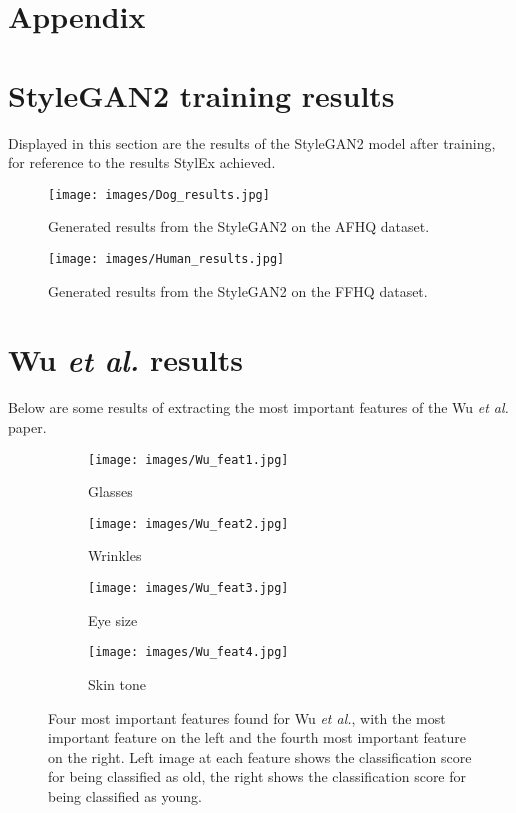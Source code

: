 \newpage
\appendix

\section*{Appendix}
\label{sec:appendix}

\section{StyleGAN2 training results}
Displayed in this section are the results of the StyleGAN2 model after training, for reference to the results StylEx achieved.
\begin{figure}[H]
     \centering
     \texttt{[image: images/Dog\_results.jpg]}
     \caption{Generated results from the StyleGAN2 on the AFHQ dataset.}
     \label{fig:SG2_Anim}
\end{figure}


\begin{figure}[H]
     \centering
     \texttt{[image: images/Human\_results.jpg]}
     \caption{Generated results from the StyleGAN2 on the FFHQ dataset.}
     \label{fig:SG2_Hum}
\end{figure}

\section{Wu \textit{et al.} results}
Below are some results of extracting the most important features of the Wu \textit{et al.} paper.
\begin{figure}[H]
     \centering
     \begin{subfigure}[b]{0.24\textwidth}
     \centering
     \texttt{[image: images/Wu\_feat1.jpg]}
     \caption{Glasses}
     \label{fig:wu1}
     \end{subfigure}
     \hfill
     \begin{subfigure}[b]{0.24\textwidth}
     \centering
     \texttt{[image: images/Wu\_feat2.jpg]}
     \caption{Wrinkles}
     \label{fig:wu2}
     \end{subfigure}
     \hfill
     \begin{subfigure}[b]{0.24\textwidth}
     \centering
     \texttt{[image: images/Wu\_feat3.jpg]}
     \caption{Eye size}
     \label{fig:wu3}
     \end{subfigure}
     \hfill
     \begin{subfigure}[b]{0.24\textwidth}
     \centering
     \texttt{[image: images/Wu\_feat4.jpg]}
     \caption{Skin tone}
     \label{fig:wu4}
     \end{subfigure}
     \caption{Four most important features found for Wu \textit{et al.}, with the most important feature on the left and the fourth most important feature on the right. Left image at each feature shows the classification score for being classified as old, the right shows the classification score for being classified as young.}
     \label{fig:wu_feats}
\end{figure}


